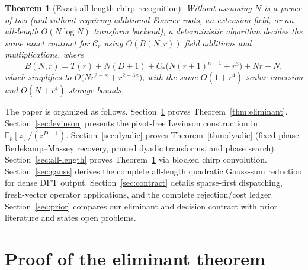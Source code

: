 \documentclass[11pt,reqno]{amsart}
\numberwithin{equation}{section}
\newtheorem{theorem}{Theorem}[section]
\theoremstyle{definition}
\theoremstyle{remark}
\newcommand{\F}{\mathbb{F}}
\begin{document}
\begin{theorem}[Exact all-length chirp recognition]
\label{thm:all-length}
Without assuming $N$ is a power of two (and without requiring additional Fourier roots, an extension field, or an all-length $O(N\log N)$ transform backend), a deterministic algorithm decides the same exact contract for $\mathcal{C}_r$ using $O(B(N,r))$ field additions and multiplications, where
\begin{equation}
\label{eq:B-env}
B(N,r) = T(r) + N(D+1) + C_*\bigl(N(r+1)^{\kappa-1} + r^3\bigr) + Nr + N,
\end{equation}
which simplifies to $O\bigl(Nr^{2+\kappa} + r^{2+3\kappa}\bigr)$, with the same $O(1+r^4)$ scalar inversion and $O(N+r^4)$ storage bounds.
\end{theorem}

The paper is organized as follows. Section~\ref{sec:eliminant} proves Theorem~\ref{thm:eliminant}. Section~\ref{sec:levinson} presents the pivot-free Levinson construction in $\F_p[z]/(z^{D+1})$. Section~\ref{sec:dyadic} proves Theorem~\ref{thm:dyadic} (fixed-phase Berlekamp--Massey recovery, pruned dyadic transforms, and phase search). Section~\ref{sec:all-length} proves Theorem~\ref{thm:all-length} via blocked chirp convolution. Section~\ref{sec:gauss} derives the complete all-length quadratic Gauss-sum reduction for dense DFT output. Section~\ref{sec:contract} details sparse-first dispatching, fresh-vector operator applications, and the complete rejection/cost ledger. Section~\ref{sec:prior} compares our eliminant and decision contract with prior literature and states open problems.

\section{Proof of the eliminant theorem}
\label{sec:eliminant}
\end{document}
